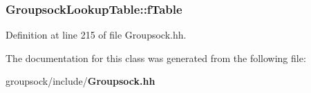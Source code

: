 \subsubsection[{f\+Table}]{ Groupsock\+Lookup\+Table\+::f\+Table\hspace{0.3cm}{\ttfamily [private]}}\label{classGroupsockLookupTable_af3cc4913a5ece0654289d5b0f233aeaa}


Definition at line 215 of file Groupsock.\+hh.



The documentation for this class was generated from the following file\+:\begin{DoxyCompactItemize}
\item 
groupsock/include/{\bf Groupsock.\+hh}\end{DoxyCompactItemize}
